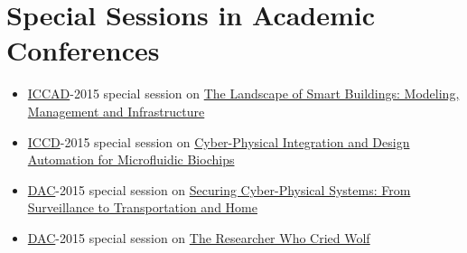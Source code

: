 \section{Special Sessions in Academic Conferences}
\begin{itemize}
    \item
    \href{http://www.iccad.com/}{ICCAD}-2015 special session on
    \href{http://iccad.com/event_details?id=196-5-D}{The Landscape of Smart Buildings: Modeling, Management and Infrastructure}
    \item
    \href{http://www.iccd-conf.com/}{ICCD}-2015 special session on
    \href{http://rpsonline.com.sg/rps2prod/iccd2015/html/S-SS2.html}{Cyber-Physical Integration and Design Automation for Microfluidic Biochips}
    \item
    \href{http://www.dac.com/}{DAC}-2015 special session on
    \href{http://www2.dac.com/events/eventdetails.aspx?id=182-46}{Securing Cyber-Physical Systems: From Surveillance to Transportation and Home}
    \item
    \href{http://www.dac.com/}{DAC}-2015 special session on
    \href{http://www2.dac.com/events/eventdetails.aspx?id=182-10}{The Researcher Who Cried Wolf}
\end{itemize}


